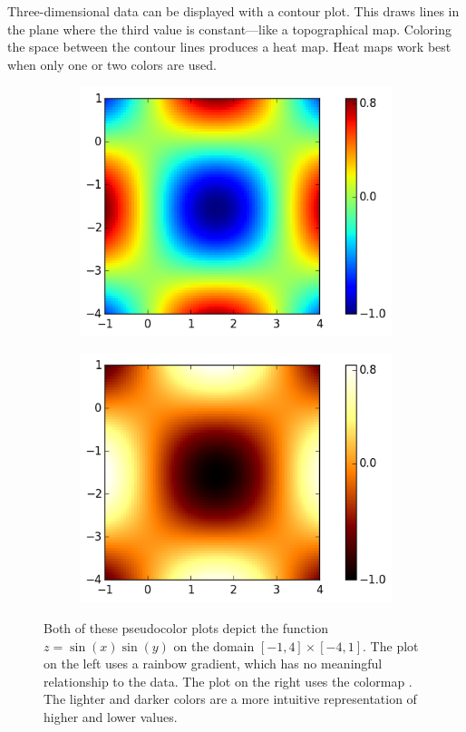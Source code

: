 Three-dimensional data can be displayed with a contour plot.
This draws lines in the plane where the third value is constant---like a topographical map.
Coloring the space between the contour lines produces a heat map.
Heat maps work best when only one or two colors are used.

\begin{figure}[h]
\centering
\begin{subfigure}{.5\textwidth}
  \centering
  \includegraphics[width=\textwidth]{heatmap_color.png}
\end{subfigure}%
\begin{subfigure}{.5\textwidth}
  \centering
  \includegraphics[width=\textwidth]{heatmap_hot.png}
\end{subfigure}
\caption{Both of these pseudocolor plots depict the function
	$z = \sin(x)\sin(y)$ on the domain $[-1,4] \times [-4,1]$.
The plot on the left uses a rainbow gradient, which has no meaningful relationship to the data.
The plot on the right uses the colormap .  The lighter and darker colors are a more intuitive
representation of higher and lower values.}

\label{fig:heatmap}
\end{figure}

